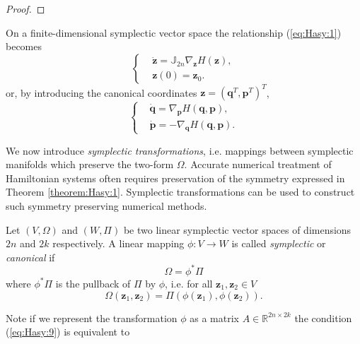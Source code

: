 {\begin{proof}
\end{proof}
\begin{theorem} \label{theorem:Hasy:1.7}
On a finite-dimensional symplectic vector space the relationship (\ref{eq:Hasy:1}) becomes \cite{Marsden:1999ck}
\begin{equation} \label{eq:Hasy:7}
\left\{
\begin{aligned}
	&\dot {\mathbf z} = \mathbb{J}_{2n} \nabla_{\mathbf z} H(\mathbf z), \\
	& \mathbf z(0) = \mathbf z_0.
\end{aligned}
\right.
\end{equation}
or, by introducing the canonical coordinates $\mathbf z = (\mathbf q^T, \mathbf p^T)^T$,
\begin{equation} \label{eq:Hasy:8}
\left\{
\begin{aligned}
	&\dot {\mathbf q} = \nabla_{\mathbf p} H(\mathbf q,\mathbf p),\\
	&\dot {\mathbf p} = - \nabla_{\mathbf q} H(\mathbf q,\mathbf p).
\end{aligned}
\right.
\end{equation}
\end{theorem}
}

We now introduce \emph{symplectic transformations}, i.e. mappings between symplectic manifolds which preserve the two-form $\Omega$. Accurate numerical treatment of Hamiltonian systems often requires preservation of the symmetry expressed in Theorem \ref{theorem:Hasy:1}. Symplectic transformations can be used to construct such symmetry preserving numerical methods. 

{\edit
\begin{definition}
Let $(V,\Omega)$ and $(W,\Pi)$ be two linear symplectic vector spaces of dimensions $2n$ and $2k$ respectively. A linear mapping $\phi:V \to W$ is called \emph{symplectic} or \emph{canonical} if
\begin{equation} \label{eq:Hasy:9}
	\Omega = \phi^* \Pi
\end{equation}
where $\phi^* \Pi$ is the pullback of $\Pi$ by $\phi$, i.e. for all $\mathbf{z}_1, \mathbf{z}_2\in V$
\begin{equation}
	\Omega(\mathbf{z}_1,\mathbf{z}_2) = \Pi(\phi(\mathbf{z}_1),\phi(\mathbf{z}_2)).
\end{equation}
\end{definition}

Note if we represent the transformation $\phi$ as a matrix $A\in \mathbb R^{2n\times 2k}$ the condition (\ref{eq:Hasy:9}) is equivalent to \cite{Marsden:1999ck}}

